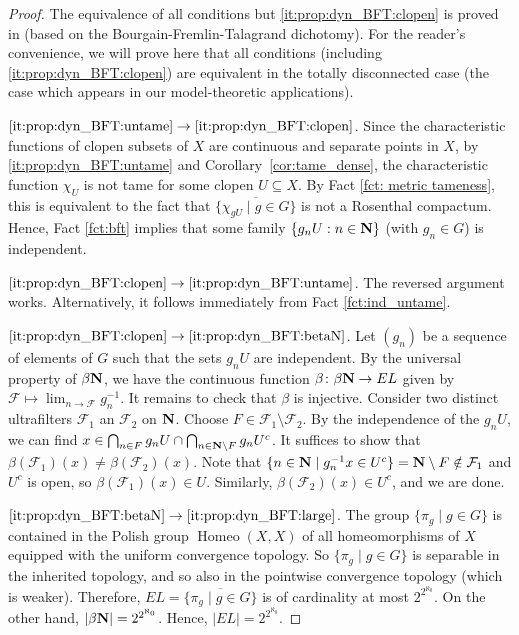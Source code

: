 	\begin{proof}
		The equivalence of all conditions but \ref{it:prop:dyn_BFT:clopen}
		is proved in \cite[Theorem 3.2]{GM06} (based on the Bourgain-Fremlin-Talagrand dichotomy).
		For the reader's convenience, we will prove here that all conditions (including \ref{it:prop:dyn_BFT:clopen}) are equivalent in the totally disconnected case (the case which appears in our model-theoretic applications).
		
		$\ref{it:prop:dyn_BFT:untame} \rightarrow \ref{it:prop:dyn_BFT:clopen}$. Since the characteristic functions of clopen subsets of $X$ are continuous and separate points in $X$, by \ref{it:prop:dyn_BFT:untame} and Corollary~\ref{cor:tame_dense}, the characteristic function $\chi_U$ is not tame for some clopen $U\subseteq X$. By Fact \ref{fct: metric tameness}, this is equivalent to the fact that $\overline{\{\chi_{gU} \mid g \in G\}}$ is not a Rosenthal compactum. Hence, Fact \ref{fct:bft} implies that some family $\{g_n U: n \in {\mathbf{N}}\}$ (with $g_n \in G$) is independent.
		
		$\ref{it:prop:dyn_BFT:clopen} \rightarrow \ref{it:prop:dyn_BFT:untame}$. The reversed argument works. Alternatively, it follows immediately from Fact \ref{fct:ind_untame}.
		
		$\ref{it:prop:dyn_BFT:clopen} \rightarrow \ref{it:prop:dyn_BFT:betaN}$. Let $(g_n)$ be a sequence of elements of $G$ such that the sets $g_n U$ are independent. By the universal property of $\beta {\mathbf{N}}$, we have the continuous function $\beta \colon \beta {\mathbf{N}}\to EL$ given by $\mathcal F\mapsto \lim_{n\to \mathcal F} g_n^{-1}$. It remains to check that $\beta$ is injective. Consider two distinct ultrafilters $\mathcal F_1$ an $\mathcal F_2$ on ${\mathbf{N}}$. Choose $F \in \mathcal F_1 \setminus \mathcal F_2$. By the independence of the $g_n U$, we can find $x \in \bigcap_{n \in F} g_nU \cap \bigcap_{n \in {\mathbf{N}} \setminus F} g_nU^c$. It suffices to show that $\beta(\mathcal F_1)(x) \ne \beta(\mathcal F_2)(x)$. Note that $\{n \in {\mathbf{N}} \mid g_n^{-1}x \in U^c\} = {\mathbf{N}} \setminus F \notin \mathcal F_1$ and $U^c$ is open, so $\beta(\mathcal F_1)(x) \in U$. Similarly, $\beta(\mathcal F_2)(x) \in U^c$, and we are done.
		
		$\ref{it:prop:dyn_BFT:betaN} \rightarrow \ref{it:prop:dyn_BFT:large}$. The group $\{\pi_g \mid g \in G\}$ is contained in the Polish group $\operatorname{Homeo}(X,X)$ of all homeomorphisms of $X$ equipped with the uniform convergence topology. So $\{\pi_g \mid g \in G\}$ is separable in the inherited topology, and so also in the pointwise convergence topology (which is weaker). Therefore, $EL =\overline{ \{\pi_g \mid g \in G\}}$ is of cardinality at most $2^{2^{\aleph_0}}$. On the other hand, $|\beta{\mathbf{N}}| = 2^{2^{\aleph_0}}$. Hence, $|EL|= 2^{2^{\aleph_0}}$.
		

\end{proof}
